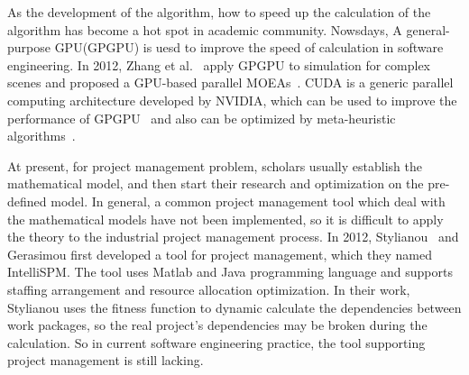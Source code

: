 As the development of the algorithm, how to speed up the calculation of the algorithm
has become a hot spot in academic community. Nowsdays,  A general-purpose GPU(GPGPU) is uesd 
to improve the speed of calculation in software engineering. In 2012, Zhang et al.~\cite{zhang} apply GPGPU to
simulation for complex scenes and proposed a GPU-based parallel MOEAs~\cite{li}.
CUDA is a generic parallel computing architecture developed by NVIDIA, which can be used to improve the performance of GPGPU~\cite{langdon2} and also can be optimized by meta-heuristic algorithms~\cite{langdon1}.


At present, for project management problem, scholars usually establish the
mathematical model, and then start their research and optimization on the
pre-defined model. In general, a common project management tool which deal with
the mathematical models have not been implemented, so it is difficult to apply
the theory to the industrial project management process. In 2012, Stylianou~\cite{stylianou} and
Gerasimou first developed a tool for project management, which they named
IntelliSPM. The tool uses Matlab and Java programming language and 
supports staffing arrangement and resource allocation optimization. In
their work, Stylianou uses the fitness function to dynamic calculate the
dependencies between work packages, so the real project's dependencies may be
broken during the calculation. So in current software engineering practice, the
tool supporting project management is still lacking.


